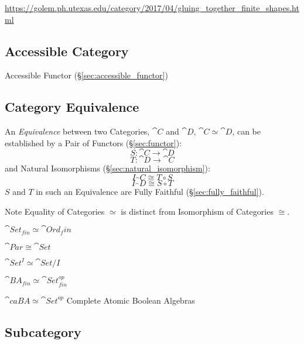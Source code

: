 \url{https://golem.ph.utexas.edu/category/2017/04/gluing_together_finite_shapes.html}



\subsection{Accessible Category}\label{sec:accessible_category}

Accessible Functor (\S\ref{sec:accessible_functor})



\subsection{Category Equivalence}\label{sec:category_equivalence}

An \emph{Equivalence} between two Categories, $\cat{C}$ and
$\cat{D}$, $\cat{C} \simeq \cat{D}$, can be established by a
Pair of Functors (\S\ref{sec:functor}):
\[
  S : \cat{C} \rightarrow \cat{D}
\]\[
  T : \cat{D} \rightarrow \cat{C}
\]
and Natural Isomorphisms (\S\ref{sec:natural_isomorphism}):
\[
  I_\cat{C} \cong T \circ S
\]\[
  I_\cat{D} \cong S \circ T
\]
$S$ and $T$ in such an Equivalence are Fully Faithful
(\S\ref{sec:fully_faithful}).

\fist Note Equality of Categories $\simeq$ is distinct from
Isomorphism of Categories $\cong$.

$\cat{Set}_{fin} \simeq \cat{Ord}_fin$

$\cat{Par} \cong \cat{Set}$

$\cat{Set}^I \simeq \cat{Set}/I$

$\cat{BA}_{fin} \simeq \cat{Set}_{fin}^{op}$

$\cat{caBA} \simeq \cat{Set}^{op}$ Complete Atomic Boolean
Algebras %



\subsection{Subcategory}\label{sec:subcategory}

